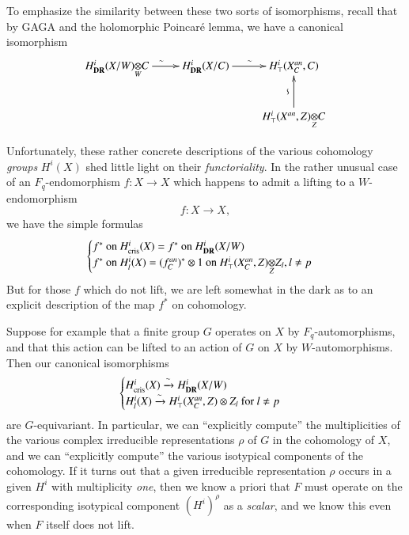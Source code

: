To emphasize the similarity between these two sorts of isomorphisms, recall that by GAGA and the holomorphic Poincar\'e lemma, we have a canonical isomorphism
\[
\xymatrix{
\foprod{H^{i}_{\DR}(X/W)}{C}{W}\ar[r]^{\sim} & H^{i}_{\DR}(X/C)\ar[r]^{\sim} & H^{i}_{\top}(X^{an}_{C},C)\\
                                         &                           & \foprod{H^{i}_{\top}(X^{an},Z)}{C}{Z}\ar[u]^{\rotatebox{90}{$\backsim$}}
}
\]

Unfortunately, these rather concrete descriptions of the various cohomology {\em groups} $H^{i}(X)$ shed little light on their {\em functoriality}. In the rather unusual case of an $F_{q}$-endomorphism $f:X\to X$ which happens to admit a lifting to a $W$-endomorphism
$$
f:X\to X,
$$
we have the simple formulas
$$
\begin{cases}
f^{*}\text{~ on~ } H^{i}_{\text{cris}}(X)=f^{*}\text{~ on~ } H^{i}_{\DR}(X/W)\\
f^{*}\text{~ on~ } H^{i}_{l}(X)=(f^{an}_{C})^{*}\otimes 1\text{~ on~ } \foprod{H^{i}_{\top}(X^{an}_{C},Z)}{Z_{l},l\neq p}{Z}
\end{cases}
$$
But for those $f$ which do not lift, we are left somewhat in the dark as to an explicit description of the map $f^{*}$ on cohomology.

Suppose for example that a finite group $G$ operates on $X$ by $F_{q}$-automorphisms, and that this action can be lifted to an action of $G$ on $X$ by $W$-automorphisms. Then our canonical isomorphisms
$$
\begin{cases}
H^{i}_{\text{cris}}(X)\xrightarrow{\sim} H^{i}_{\mathbf{DR}}(X/W)\\
H^{i}_{l}(X)\xrightarrow{\sim} H^{i}_{\top}(X^{an}_{C},Z)\otimes Z_{l}\text{~ for~ } l\neq p
\end{cases}
$$\pageoriginale
are $G$-equivariant. In particular, we can ``explicitly compute'' the multiplicities of the various complex irreducible representations $\rho$ of $G$ in the cohomology of $X$, and we can ``explicitly compute'' the various isotypical components of the cohomology. If it turns out that a given irreducible representation $\rho$ occurs in a given $H^{i}$ with multiplicity {\em one}, then we know a priori that $F$ must operate on the corresponding isotypical component $(H^{i})^{\rho}$ as a {\em scalar}, and we know this even when $F$ itself does not lift.

